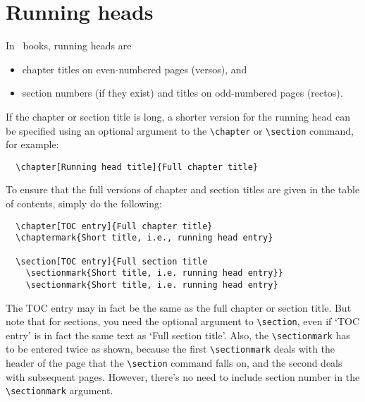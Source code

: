 \section{Running heads}
In \cambridge\ books, running heads are
\begin{itemize}
\item chapter titles on even-numbered pages (versos), and
\item section numbers (if they exist) and titles  on odd-numbered pages (rectos).
\end{itemize}

If the chapter or section title is long, a shorter version for the running
head can be specified using an optional argument
to the \verb"\chapter" or \verb"\section" command, for example:
\begin{verbatim}
  \chapter[Running head title]{Full chapter title}
\end{verbatim}

To ensure that the full versions of chapter and section titles are
given in the table of contents, simply do the following:

\begin{verbatim}
  \chapter[TOC entry]{Full chapter title}
  \chaptermark{Short title, i.e., running head entry}

  \section[TOC entry]{Full section title
    \sectionmark{Short title, i.e. running head entry}}
    \sectionmark{Short title, i.e. running head entry}
\end{verbatim}
The TOC entry may in fact be the same as the full chapter or section title.
But note that for sections, you need the optional argument to \verb"\section",
even if `TOC entry' is in fact the same text as `Full section title'.
Also, the \verb"\sectionmark" has to be entered twice as shown, because
the first \verb"\sectionmark" deals with the header of the page that
the \verb"\section" command falls on, and the second deals with subsequent pages.
However, there's no need to include section number in the \verb"\sectionmark" argument.

